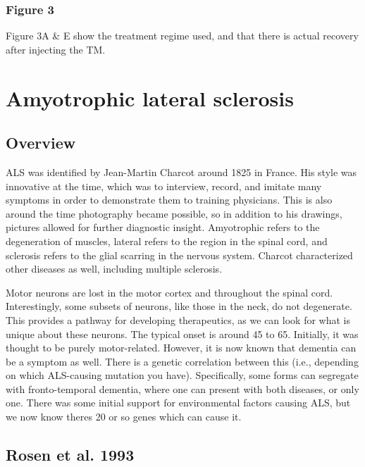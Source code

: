 \documentclass[12pt]{report}
\begin{document}
\subsubsection{Figure 3}

Figure 3A \& E show the treatment regime used, and that there is actual recovery after injecting the TM. 


\section{Amyotrophic lateral sclerosis}

\subsection{Overview}

ALS was identified by Jean-Martin Charcot around 1825 in France. His style was innovative at the time, which was to interview, record, and imitate many symptoms in order to demonstrate them to training physicians. This is also around the time photography became possible, so in addition to his drawings, pictures allowed for further diagnostic insight. Amyotrophic refers to the degeneration of muscles, lateral refers to the region in the spinal cord, and sclerosis refers to the glial scarring in the nervous system. Charcot characterized other diseases as well, including multiple sclerosis.\newline

Motor neurons are lost in the motor cortex and throughout the spinal cord. Interestingly, some subsets of neurons, like those in the neck, do not degenerate. This provides a pathway for developing therapeutics, as we can look for what is unique about these neurons. The typical onset is around 45 to 65. Initially, it was thought to be purely motor-related. However, it is now known that dementia can be a symptom as well. There is a genetic correlation between this (i.e., depending on which ALS-causing mutation you have). Specifically, some forms can segregate with fronto-temporal dementia, where one can present with both diseases, or only one. There was some initial support for environmental factors causing ALS, but we now know theres 20 or so genes which can cause it. 

\subsection{Rosen et al. 1993}
\end{document}
